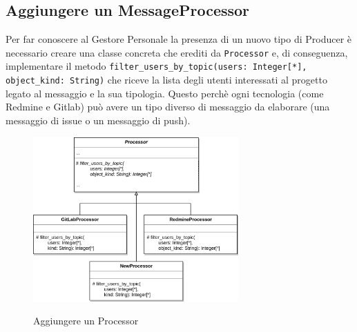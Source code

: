 \subsection{Aggiungere un MessageProcessor} \label{EstProcessor}

Per far conoscere al Gestore Personale la presenza di un nuovo tipo di Producer è necessario creare una classe concreta che erediti da \texttt{Processor} e, di conseguenza, implementare il metodo \texttt{filter\_users\_by\_topic(users: Integer[*], object\_kind: String)} che riceve la lista degli utenti interessati al progetto legato al messaggio e la sua tipologia.
Questo perchè ogni tecnologia (come Redmine e Gitlab) può avere un tipo diverso di messaggio da elaborare (una messaggio di issue o un messaggio di push).


\begin{figure}[H]
    \centering
    \includegraphics[width=0.7\textwidth]{img/EstensioneGP-Processor.png}\\
    \caption{Aggiungere un Processor}
\end{figure}
